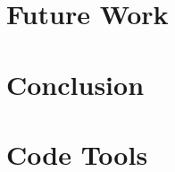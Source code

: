 \documentclass[12pt, twoside]{report_bachelorarbeit}
\begin{document}
\chapter{Future Work}

\chapter{Conclusion}

\appendix

\chapter{Code Tools}
\label{app:codetools}
\clearpage
\pagestyle{plain}
\printbibliography

\newpage
%
\end{document}
